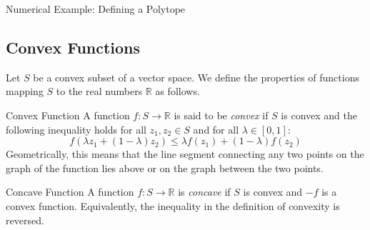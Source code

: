 \begin{examplebox}{Numerical Example: Defining a Polytope}
\begin{center}
	\label{fig:polyhedron}
	\end{center}
	
\end{examplebox}


\subsection{Convex Functions}

Let $S$ be a convex subset of a vector space. We define the properties of functions mapping $S$ to the real numbers $\mathbb{R}$ as follows.

\begin{defnbox}{Convex Function}
	A function $f: S \rightarrow \mathbb{R}$ is said to be \emph{convex} if $S$ is convex and the following inequality holds for all $z_1, z_2 \in S$ and for all $\lambda \in [0, 1]$:
	\begin{equation}
		f(\lambda z_1 + (1 - \lambda)z_2) \leq \lambda f(z_1) + (1 - \lambda)f(z_2)
	\end{equation}
	Geometrically, this means that the line segment connecting any two points on the graph of the function lies above or on the graph between the two points.
\end{defnbox}
	
\begin{defnbox}{Concave Function}
	A function $f: S \rightarrow \mathbb{R}$ is \emph{concave} if $S$ is convex and $-f$ is a convex function. Equivalently, the inequality in the definition of convexity is reversed.
\end{defnbox}


